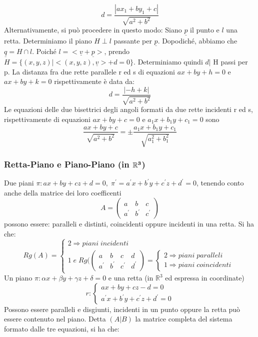 \documentclass[12pt]{article}
\newenvironment{para}{\begin{adjustwidth}{13mm}{}}{\end{adjustwidth}}
\begin{document}
\begin{para}
$$d=\frac{|ax_1+by_1+c|}{\sqrt{a^2+b^2}}$$
Alternativamente, si può procedere in questo modo: Siano $\underline{p}$ il punto e $l$ una retta. Determiniamo il piano $H \perp l$ passante per $\underline{p}$. Dopodiché, abbiamo che $\underline{q} = H \cap l$. Poiché $l = <\underline{v}+\underline{p}>$, prendo $H = \{(x,y,z)|<(x,y,z),\underline{v}> +d = 0\}$. Determiniamo quindi $d|$ H passi per p.\newline
La distanza fra due rette parallele r ed s di equazioni $ax+by+h = 0$ e $ax+by+k = 0$ rispettivamente è data da: $$d=\frac{|-h+k|}{\sqrt{a^2+b^2}}$$
Le equazioni delle due bisettrici degli angoli formati da due rette incidenti r ed s, rispettivamente di equazioni $ax+by+c = 0$ e $a_1x+b_1y+c_1=0$ sono $$\frac{ax+by+c}{\sqrt{a^2+b^2}}=\pm \frac{a_1x+b_1y+c_1}{\sqrt{a_1^2+b_1^2}}$$
\subsubsection{Retta-Piano e Piano-Piano (in $\bold{\mathbb{R}^3}$)}
Due piani $\pi: ax+by+cz+d = 0, \; \pi^{'}=a^{'}x+b^{'}y+c^{'}z+d^{'}=0$, tenendo conto anche della matrice dei loro coefficenti 
$$A = \begin{pmatrix}
    a & b & c \\
    a^{'} & b^{'} & c^{'}
\end{pmatrix}$$
possono essere: paralleli e distinti, coincidenti oppure incidenti in una retta. Si ha che:
$$Rg(A) = \begin{cases}
    2 \Rightarrow piani \; incidenti \\
    1 \; e \; Rg(\begin{pmatrix}
        a & b & c & d \\
        a^{'} & b^{'} & c^{'} & d^{'}
    \end{pmatrix} = \begin{cases}
        2 \Rightarrow piani \; paralleli \\
        1 \Rightarrow piani \; coincidenti
    \end{cases}
\end{cases}$$
Un piano $\pi: \alpha x + \beta y + \gamma z + \delta = 0$ e una retta (in $\mathbb{R}^3$ ed espressa in coordinate)\newline $$r:\begin{cases}
    ax+by+cz-d = 0 \\
    a^{'}x+b^{'}y+c^{'}z+d^{'} = 0
\end{cases}$$
\newline Possono essere paralleli e disgiunti, incidenti in un punto oppure la retta può essere contenuto nel piano. Detta $(A|B)$ la matrice completa del sistema formato dalle tre equazioni, si ha che:

\end{para}
\end{document}

